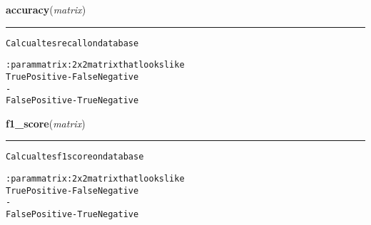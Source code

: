     \vspace{0.5ex}

\hspace{.8\funcindent}\begin{boxedminipage}{\funcwidth}

    \raggedright \textbf{accuracy}(\textit{matrix})

    \vspace{-1.5ex}

    \rule{\textwidth}{0.5\fboxrule}
\setlength{\parskip}{2ex}
\begin{alltt}
Calcualtes recall on database

:param matrix: 2x2 matrix that looks like
True Positive  - False Negative
     {\textbar}         -       {\textbar}
False Positive - True Negative
\end{alltt}

\setlength{\parskip}{1ex}
    \end{boxedminipage}

    \label{hal:ml:utils:matrix:f1_score}

    \vspace{0.5ex}

\hspace{.8\funcindent}\begin{boxedminipage}{\funcwidth}

    \raggedright \textbf{f1\_score}(\textit{matrix})

    \vspace{-1.5ex}

    \rule{\textwidth}{0.5\fboxrule}
\setlength{\parskip}{2ex}
\begin{alltt}
Calcualtes f1 score on database

:param matrix: 2x2 matrix that looks like
True Positive  - False Negative
     {\textbar}         -       {\textbar}
False Positive - True Negative
\end{alltt}

\setlength{\parskip}{1ex}
    \end{boxedminipage}

    \label{hal:ml:utils:matrix:get_column_of_matrix}

